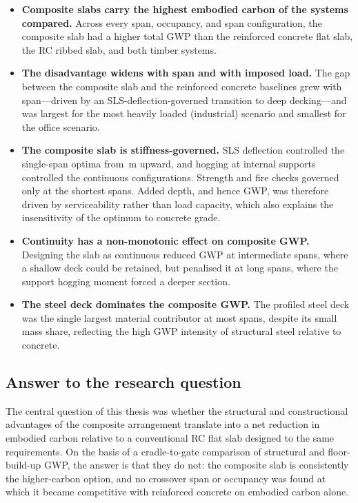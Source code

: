 \begin{itemize}
    \item \textbf{Composite slabs carry the highest embodied carbon of the systems compared.} Across every span, occupancy, and span configuration, the composite slab had a higher total GWP than the reinforced concrete flat slab, the RC ribbed slab, and both timber systems. 

    \item \textbf{The disadvantage widens with span and with imposed load.} The gap between the composite slab and the reinforced concrete baselines grew with span---driven by an SLS-deflection-governed transition to deep decking---and was largest for the most heavily loaded (industrial) scenario and smallest for the office scenario.

    \item \textbf{The composite slab is stiffness-governed.} SLS deflection controlled the single-span optima from \,m upward, and hogging at internal supports controlled the continuous configurations. Strength and fire checks governed only at the shortest spans. Added depth, and hence GWP, was therefore driven by serviceability rather than load capacity, which also explains the insensitivity of the optimum to concrete grade.

    \item \textbf{Continuity has a non-monotonic effect on composite GWP.} Designing the slab as continuous reduced GWP at intermediate spans, where a shallow deck could be retained, but penalised it at long spans, where the support hogging moment forced a deeper section.

    \item \textbf{The steel deck dominates the composite GWP.} The profiled steel deck was the single largest material contributor at most spans, despite its small mass share, reflecting the high GWP intensity of structural steel relative to concrete.
\end{itemize}

\subsection{Answer to the research question}
\label{sec:concl_answer}
The central question of this thesis was whether the structural and constructional advantages of the composite arrangement translate into a net reduction in embodied carbon relative to a conventional RC flat slab designed to the same requirements. On the basis of a cradle-to-gate comparison of structural and floor-build-up GWP, the answer is that they do not: the composite slab is consistently the higher-carbon option, and no crossover span or occupancy was found at which it became competitive with reinforced concrete on embodied carbon alone.

